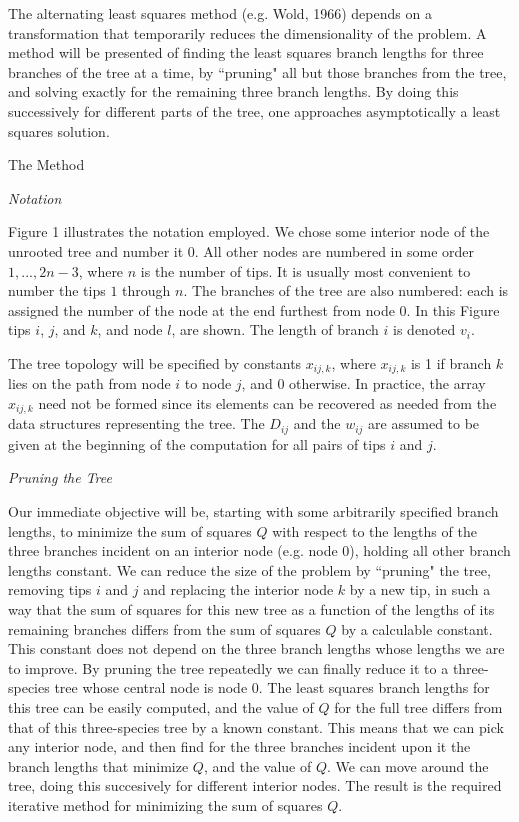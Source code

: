 \documentclass[12pt]{article}
\begin{document}
The alternating least squares method (e.g. Wold, 1966)
depends on a transformation that
temporarily reduces the dimensionality of the problem.  A method will be 
presented of
finding the least squares branch lengths for three branches of the tree at a
time, by ``pruning" all but those branches from the tree, and solving exactly for
the remaining three branch lengths.  By doing this successively for
different parts of the tree, one approaches asymptotically a least squares
solution.
\bigskip

\centerline{\sc The Method}
\bigskip

\centerline{\it Notation}
\bigskip

Figure 1 illustrates the notation employed.  We chose some interior node of the
unrooted tree and number it $0$.  All other nodes are numbered in some order
$1, ... , 2n - 3$, where $n$ is the number of tips.  It is usually most
convenient to number the tips $1$ through $n$.  The branches of the tree are
also numbered: each is
assigned the number of the node at the end furthest from node $0$.  In this
Figure tips $i$, $j$, and $k$, and node $l$, are shown.  The length of branch $i$ is denoted
$v_i$.  

The tree topology will be specified by constants $x_{ij,k}$, where
$x_{ij,k}$ is 1 if branch $k$ lies on the path from node $i$ to node $j$, and $0$
otherwise.  In practice, the array $x_{ij,k}$ need not be formed
since its elements can be recovered as needed from the data structures 
representing the tree.  The $D_{ij}$ and the $w_{ij}$ are assumed to be
given at the beginning of the computation for all pairs of tips $i$ and $j$.
\bigskip

\newpage

\centerline{\it Pruning the Tree}
\bigskip

Our immediate objective will be, starting with some arbitrarily specified
branch lengths, to minimize the sum of squares $Q$ with
respect to the lengths of the three branches incident on an interior node
(e.g. node 0), holding all other branch lengths constant. 
We can reduce the size of the problem by ``pruning" the tree,
removing tips $i$ and $j$ and replacing the interior node $k$ by a new tip, in such a way
that the sum of squares for this new tree as a function of the lengths of its remaining
branches differs from the sum of squares $Q$ by a calculable constant.
This constant
does not depend on the three branch lengths whose lengths we are to 
improve. By pruning the tree repeatedly we can finally reduce it to a
three-species tree whose central node is node 0.  The least squares branch 
lengths for this tree can be easily computed, and the value of $Q$ for the
full tree differs from that of this three-species tree by a known constant.  
This means that we can pick any interior node, and then find for the three
branches incident upon it the branch lengths that minimize $Q$, and the value
of $Q$.  We can move around the tree, doing this succesively for different 
interior
nodes.  The result is the required iterative method for minimizing the sum of 
squares $Q$.
\end{document}
